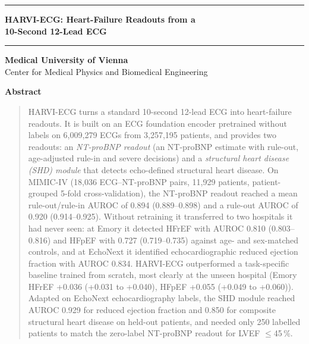 \documentclass[10pt]{article}
\begin{document}
\thispagestyle{plain}
\begin{center}
\rule{\linewidth}{4pt}\par\vspace{0.18in}
{\LARGE\bfseries HARVI-ECG: Heart-Failure Readouts from a\\[2pt] 10-Second 12-Lead ECG\par}
\vspace{0.12in}\rule{\linewidth}{1pt}\par\vspace{0.22in}
{\bfseries Medical University of Vienna}\\
Center for Medical Physics and Biomedical Engineering\par
\vspace{0.2in}
\end{center}
\begin{center}{\large\bfseries Abstract}\end{center}\vspace{-4pt}
\begin{quote}\small
HARVI-ECG turns a standard 10-second 12-lead ECG into heart-failure readouts. It is built on an ECG foundation encoder pretrained without labels on 6{,}009{,}279 ECGs from 3{,}257{,}195 patients, and provides two readouts: an \emph{NT-proBNP readout} (an NT-proBNP estimate with rule-out, age-adjusted rule-in and severe decisions) and a \emph{structural heart disease (SHD) module} that detects echo-defined structural heart disease. On MIMIC-IV (18{,}036 ECG--NT-proBNP pairs, 11{,}929 patients, patient-grouped 5-fold cross-validation), the NT-proBNP readout reached a mean rule-out/rule-in AUROC of 0.894 (0.889--0.898) and a rule-out AUROC of 0.920 (0.914--0.925). Without retraining it transferred to two hospitals it had never seen: at Emory it detected HFrEF with AUROC 0.810 (0.803--0.816) and HFpEF with 0.727 (0.719--0.735) against age- and sex-matched controls, and at EchoNext it identified echocardiographic reduced ejection fraction with AUROC 0.834. HARVI-ECG outperformed a task-specific baseline trained from scratch, most clearly at the unseen hospital (Emory HFrEF +0.036 (+0.031 to +0.040), HFpEF +0.055 (+0.049 to +0.060)). Adapted on EchoNext echocardiography labels, the SHD module reached AUROC 0.929 for reduced ejection fraction and 0.850 for composite structural heart disease on held-out patients, and needed only 250 labelled patients to match the zero-label NT-proBNP readout for LVEF $\le$45\,\%.
\end{quote}
\vspace{2pt}
\end{document}
